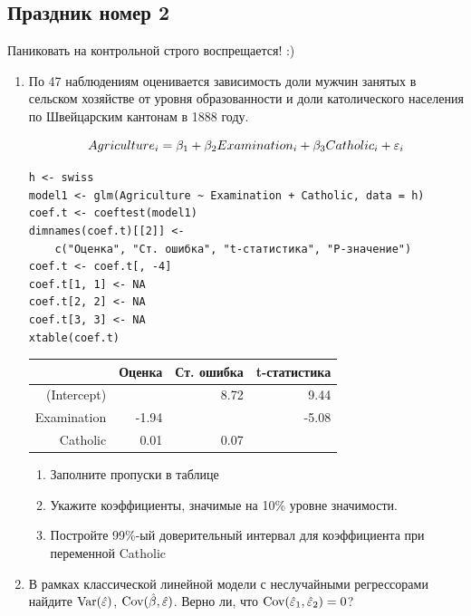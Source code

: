 \documentclass[12pt, a4paper]{article}
\begin{document}
\subsection{Праздник номер 2}


{\Large Паниковать на контрольной строго воспрещается! :)}

\begin{enumerate}

\item  По 47 наблюдениям оценивается зависимость доли мужчин занятых в сельском хозяйстве от уровня образованности и доли католического населения по Швейцарским кантонам в 1888 году.

\[Agriculture_i=\beta_1+\beta_2 Examination_i+\beta_3 Catholic_i+\varepsilon_i\]

\begin{verbatim}
h <- swiss
model1 <- glm(Agriculture ~ Examination + Catholic, data = h)
coef.t <- coeftest(model1)
dimnames(coef.t)[[2]] <-
    c("Оценка", "Ст. ошибка", "t-статистика", "P-значение")
coef.t <- coef.t[, -4]
coef.t[1, 1] <- NA
coef.t[2, 2] <- NA
coef.t[3, 3] <- NA
xtable(coef.t)
\end{verbatim}

\begin{table}[ht]
\centering
\begin{tabular}{rrrr}
  \hline
 & Оценка & Ст. ошибка & t-статистика \\
  \hline
(Intercept) &  & 8.72 & 9.44 \\
  Examination & -1.94 &  & -5.08 \\
  Catholic & 0.01 & 0.07 &  \\
   \hline
\end{tabular}
\end{table}



\begin{enumerate}
\item Заполните пропуски в таблице
\item Укажите коэффициенты, значимые на 10\% уровне значимости.
\item Постройте 99\%-ый доверительный интервал для коэффициента при переменной Catholic
\end{enumerate}

\item В рамках классической линейной модели с неслучайными регрессорами найдите $\operatorname{Var}(\hat{\varepsilon})$, $\operatorname{Cov}(\hat{\beta},\hat{\varepsilon})$. Верно ли, что $\operatorname{Cov}(\hat{\varepsilon}_1,\hat{\varepsilon}_2)=0$?


\end{enumerate}
\end{document}
